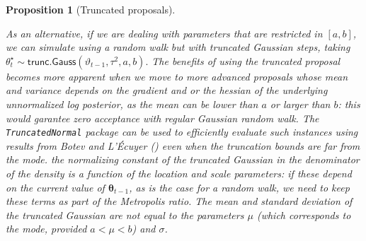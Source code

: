 \documentclass[
  11pt,
  letterpaper,
]{scrbook}
\theoremstyle{definition}
\theoremstyle{definition}
\theoremstyle{definition}
\theoremstyle{plain}
\newtheorem{proposition}{Proposition}[chapter]
\theoremstyle{plain}
\theoremstyle{remark}
\begin{document}
\begin{proposition}[Truncated
proposals]\protect\hypertarget{prp-truncated-proposals}{}\label{prp-truncated-proposals}

As an alternative, if we are dealing with parameters that are restricted
in \([a,b]\), we can simulate using a random walk but with truncated
Gaussian steps, taking
\(\theta^{\star}_{t} \sim \mathsf{trunc. Gauss}(\vartheta_{t-1}, \tau^2, a, b).\)
The benefits of using the truncated proposal becomes more apparent when
we move to more advanced proposals whose mean and variance depends on
the gradient and or the hessian of the underlying unnormalized log
posterior, as the mean can be lower than \(a\) or larger than \(b\):
this would garantee zero acceptance with regular Gaussian random walk.
The \texttt{TruncatedNormal} package can be used to efficiently evaluate
such instances using results from Botev and L'Écuyer
() even when the truncation
bounds are far from the mode. the normalizing constant of the truncated
Gaussian in the denominator of the density is a function of the location
and scale parameters: if these depend on the current value of
\(\boldsymbol{\theta}_{t-1}\), as is the case for a random walk, we need
to keep these terms as part of the Metropolis ratio. The mean and
standard deviation of the truncated Gaussian are not equal to the
parameters \(\mu\) (which corresponds to the mode, provided
\(a < \mu < b\)) and \(\sigma\).

\end{proposition}
\end{document}
